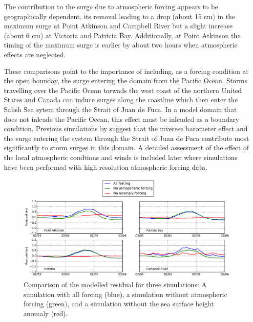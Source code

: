 \documentclass[pdftex,10pt]{article}
\begin{document}
The contribution to the surge due to atmospheric forcing appears to be geographically dependent, its removal leading to a drop (about 15 cm) in the maximum surge at Point Atkinson and Campbell River but a slight increase (about 6 cm) at Victoria and Patricia Bay. Additionally, at Point Atkinson the timing of the maximum surge is earlier by about two hours when atmospheric effects are neglected. 

These comparisons point to the importance of including, as a forcing condition at the open bounday, the surge entering the domain from the Pacific Ocean. Storms travelling over the Pacific Ocean torwads the west coast of the northern United States and Canada can induce surges along the coastline which then enter the Salish Sea sytem through the Strait of Juan de Fuca. In a model domain that does not inlcude the Pacific Ocean, this effect must be inlcuded as a boundary condition. Previous simulations by \citet{murty1995storm} suggest that the inverese barometer effect and the surge entering the system through the Strait of Juan de Fuca contribute most significantly to storm surges in this domain.  A detailed assessment of the effect of the local atmospheric condtions and winds is included later where simulations have been performed with high resolution atmospheric forcing data.  

\begin{figure}
\centering
\includegraphics[scale=0.6]{Figures/feb2006_factors.pdf}
\caption{Comparison of the modelled residual for three simulations: A simulation with all forcing (blue), a simulation without atmospheric forcing (green), and a simulation without the sea surface height anomaly (red). }
\label{fig:factors}
\end{figure}
\end{document}
